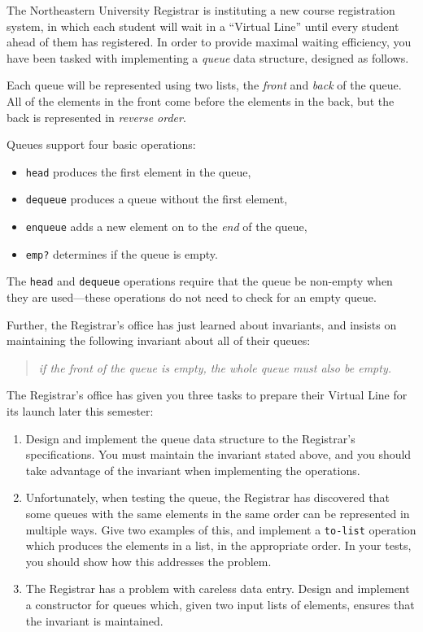 \documentclass[12pt]{article}                   %
\def\pts#1{\marginpar{\footnotesize \raggedright  \fbox{#1 {\sc Points}}}}
\begin{document}
\begin{problem} \pts{6}

The Northeastern University Registrar is instituting a new
course registration system, in which each student will wait in a
``Virtual Line'' until every student ahead of them has registered.  In
order to provide maximal waiting efficiency, you have been tasked with
implementing a \emph{queue} data structure, designed as follows.  

Each queue will be represented using two lists, the \emph{front} and
\emph{back} of the queue.  All of the elements in the front come
before the elements in the back, but the back is represented in
\emph{reverse order}.  

Queues support four basic operations:
\begin{itemize}
\item \texttt{head} produces the first element in the queue,
\item \texttt{dequeue} produces a queue without the first element,
\item \texttt{enqueue} adds a new element on to the \emph{end} of the
  queue,
\item \texttt{emp?} determines if the queue is empty.
\end{itemize}
The \texttt{head} and \texttt{dequeue} operations require that the
queue be non-empty when they are used---these operations do not need
to check for an empty queue.

Further, the Registrar's office has just learned about invariants, and
insists on maintaining the following invariant about all of their
queues:  

\begin{quote}
  {\it if the front of the queue is empty, the whole queue must also be empty.}
\end{quote} 

\noindent
The Registrar's office has given you three tasks to prepare their
Virtual Line for its launch later this semester:

\begin{enumerate}
\item Design and implement the queue data structure to the Registrar's
  specifications.  You must maintain the invariant stated above, and
  you should take advantage of the invariant when implementing the
  operations.
\item Unfortunately, when testing the queue, the Registrar has
  discovered that some queues with the same elements in the same
  order can be represented in multiple ways.  Give two examples of
  this, and implement a \texttt{to-list} operation which produces the
  elements in a list, in the appropriate order.  In your tests, you
  should show how this addresses the problem.
\item The Registrar has a problem with careless data entry.  Design
  and implement a constructor for queues which, given two input lists
  of elements, ensures that the invariant is maintained.  
\end{enumerate}


\end{problem}
\end{document}
